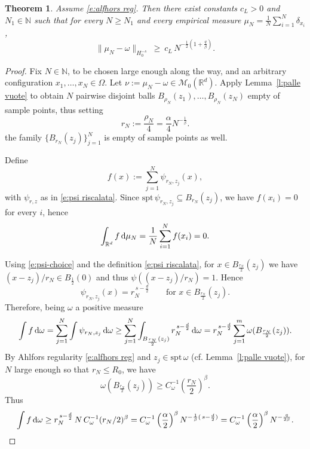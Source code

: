 \documentclass[12pt,a4paper,oneside]{amsart}
\theoremstyle{plain}
\newtheorem{theorem}{Theorem}[section]
\theoremstyle{definition}
\numberwithin{equation}{section}
\numberwithin{figure}{section}
\numberwithin{table}{section}
\theoremstyle{remark}
\newcommand{\R}{\mathbb{R}}
\newcommand{\dd}{\textup{d}}
\newcommand{\calM}{\mathcal{M}}
\newcommand{\N}{\mathbb{N}}
\newcommand{\expAhlfors}{\beta}
\begin{document}
\begin{theorem}\label{t:lower bound}
Assume \eqref{e:alfhors reg}. Then there exist constants $c_L>0$ and $N_1\in\N$ such that for every $N\ge N_1$ and every empirical measure $\mu_N=\frac1N\sum_{i=1}^N\delta_{x_i}$,
\begin{equation}\label{eq:Hdots-lower}
\|\mu_N-\omega\|_{H_0^{-s}} \ \ge\ c_L\,N^{-\frac{1}{2}(1+\frac{q}{\expAhlfors})}.
\end{equation}
\end{theorem}

\begin{proof}
Fix $N\in \N$, to be chosen large enough along the way, and an arbitrary configuration $x_1,\dots,x_N\in\Omega$.
Let $\nu:=\mu_N-\omega\in\calM_0(\R^d)$. Apply Lemma~\ref{l:palle vuote} to obtain $N$ pairwise disjoint balls
$B_{\rho_N}(z_1),\dots,B_{\rho_N}(z_N)$ empty of sample points, thus setting
\begin{equation}\label{e:r-choice}
r_N := \frac{\rho_N}{4}=\frac{\alpha}{4}N^{-\frac1\expAhlfors}.
\end{equation}
the family $\{B_{r_N}(z_j)\}_{j=1}^N$ is empty of sample points as well.

Define
\begin{equation}\label{e:f-def}
f(x):=\sum_{j=1}^N \psi_{r_N,z_j}(x),
\end{equation}
with $\psi_{r,z}$ as in \eqref{e:psi riscalata}.
Since $\mathrm{spt}\,\psi_{r_N,z_j}\subseteq B_{r_N}(z_j)$, we have $f(x_i)=0$ for every $i$, hence
\begin{equation}\label{e:f-muN}
\int_{\R^d} f\,\dd \mu_N = \frac1N\sum_{i=1}^N f(x_i)=0.
\end{equation}

Using \eqref{e:psi-choice} and the definition \eqref{e:psi riscalata},
for $x\in B_{\frac{r_N}{2}}(z_j)$ we have $(x-z_j)/r_N\in B_{\frac12}(0)$ and thus $\psi((x-z_j)/r_{N})= 1$.
Hence
\begin{equation*}
\psi_{r_N,z_j}(x) = r_N^{\,s-\frac d2}\qquad\text{for }x\in B_{\frac{r_N}{2}}(z_j).
\end{equation*}
Therefore, being $\omega$ a positive measure
\begin{equation*}
\int f\,\dd\omega
=\sum_{j=1}^N\int \psi_{r_N,z_j}\,\dd\omega
\ge \sum_{j=1}^N \int_{B_{\frac{r_N}{2}}(z_j)} r_N^{\,s-\frac d2}\,\dd\omega
=r_N^{\,s-\frac d2}\sum_{j=1}^m \omega(B_{\frac{r_N}{2}}(z_j)).     
\end{equation*}
By Ahlfors regularity \eqref{e:alfhors reg} and $z_j\in\mathrm{spt}\,\omega$ (cf. Lemma~\ref{l:palle vuote}), for $N$ large enough so that $r_N\le R_0$, we have
\begin{equation*}
\omega(B_{\frac{r_N}{2}}(z_j))\ge C^{-1}_{\omega} \left(\frac{r_N}2\right)^\expAhlfors.
\end{equation*}
Thus
\begin{equation*}
\int f\,\dd\omega
\ge r_N^{\,s-\frac d2}\,N\,C^{-1}_\omega (r_N/2)^\expAhlfors
= C^{-1}_\omega\left(\frac{ \alpha}{2}\right)^\expAhlfors N^{-\frac1\expAhlfors(\,s-\frac d2)}= C^{-1}_\omega \left(\frac{ \alpha}{2}\right)^\expAhlfors N^{-\frac{q}{2\expAhlfors }}.
\end{equation*}


\end{proof}
\end{document}
